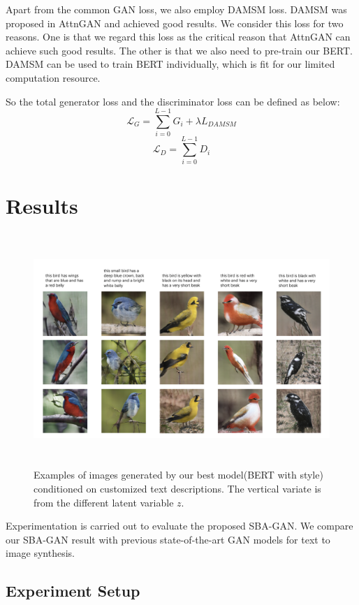 \documentclass{article}
\begin{document}
Apart from the common GAN loss, we also employ DAMSM loss\cite{attngan}. DAMSM was proposed in AttnGAN and achieved good results. We consider this loss for two reasons. One is that we regard this loss as the critical reason that AttnGAN can achieve such good results. The other is that we also need to pre-train our BERT. DAMSM can be used to train BERT individually, which is fit for our limited computation resource.

So the total generator loss and the discriminator loss can be defined as below:
\begin{equation}
    \mathcal{L}_{G} = \sum_{i=0}^{L-1} G_i + \lambda L_{DAMSM}
\end{equation}
\begin{equation}
    \mathcal{L}_{D} = \sum_{i=0}^{L-1} D_i
\end{equation}


\section{Results}
\begin{figure}[htbp]

\centering
\includegraphics[width=450pt, height=250pt]{report/fig1.png} 
\caption{Examples of images generated by our best model(BERT with style) conditioned on
customized text descriptions. The vertical variate is from the different latent variable $z$.  }
\label{fig1}
\end{figure}

Experimentation is carried out to evaluate the
proposed SBA-GAN. We compare our SBA-GAN result with previous state-of-the-art GAN models for text to image synthesis.

\subsection{Experiment Setup}
\end{document}
